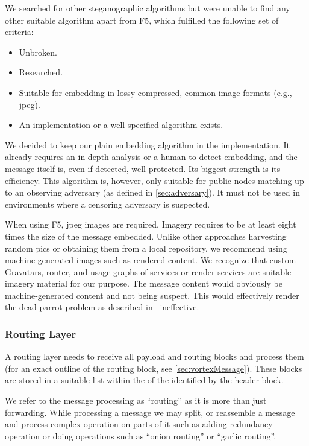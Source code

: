 We searched for other steganographic algorithms but were unable to find any other suitable algorithm apart from F5, which fulfilled the following set of criteria:
\begin{itemize}
	\item Unbroken.
	\item Researched.
	\item Suitable for embedding in lossy-compressed, common image formats (e.g., jpeg).
	\item An implementation or a well-specified algorithm exists.
\end{itemize}

We decided to keep our plain embedding algorithm in the implementation. It already requires an in-depth analysis or a human to detect embedding, and the message itself is, even if detected, well-protected. Its biggest strength is its efficiency. This algorithm is, however, only suitable for public nodes matching up to an observing adversary (as defined in \cref{sec:adversary}). It must not be used in environments where a censoring adversary is suspected.

When using F5, jpeg images are required. Imagery requires to be at least eight times the size of the message embedded. Unlike other approaches harvesting random pics or obtaining them from a local repository, we recommend using machine-generated images such as rendered content. We recognize that custom Gravatars, router, and usage graphs of services or render services are suitable imagery material for our purpose. The message content would obviously be machine-generated content and not being suspect. This would effectively render the dead parrot problem as described in~\cite{oakland2013-parrot} ineffective. 

\subsubsection{Routing Layer}\label{sec:routingLayer}
A routing layer needs to receive all payload and routing blocks and process them (for an exact outline of the routing block, see \cref{sec:vortexMessage}). These blocks are stored in a suitable list within the  of the  identified by the header block.

We refer to the message processing as ``routing'' as it is more than just forwarding. While processing a message we may split, or reassemble a message and process complex operation on parts of it such as adding redundancy operation or doing operations such as ``onion routing'' or ``garlic routing''.


